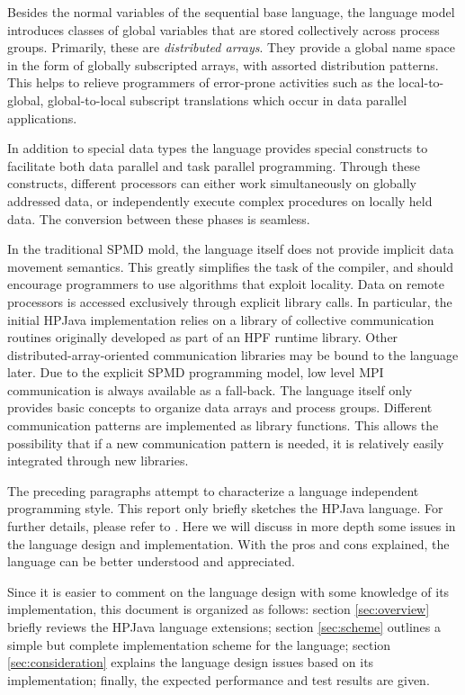 Besides the normal variables of the sequential base language, the
language model introduces classes of global variables that are stored
collectively across process groups.  Primarily, these are {\em
distributed arrays}.  They provide a global name space in the form of
globally subscripted arrays, with assorted distribution patterns.  This
helps to relieve programmers of error-prone activities such as the
local-to-global, global-to-local subscript translations which occur in
data parallel applications.

In addition to special data types the language provides special
constructs to facilitate both data parallel and task parallel
programming.  Through these constructs, different processors can either
work simultaneously on globally addressed data, or independently execute
complex procedures on locally held data.  The conversion between these
phases is seamless.

In the traditional SPMD mold, the language itself does not provide
implicit data movement semantics.  This greatly simplifies the task of
the compiler, and should encourage programmers to use algorithms that
exploit locality.  Data on remote processors is accessed exclusively
through explicit library calls.  In particular, the initial HPJava
implementation relies on a library of collective communication
routines originally developed as part of an HPF runtime library.
Other distributed-array-oriented communication libraries may be
bound to the language later.  Due to the explicit SPMD programming
model, low level MPI communication is always available as a fall-back.
The language itself only provides basic concepts to organize data
arrays and process groups.  Different communication patterns are
implemented as library functions.  This allows the possibility that if
a new communication pattern is needed, it is relatively easily
integrated through new libraries.

The preceding paragraphs attempt to characterize a language independent
programming style.  This report only briefly sketches the HPJava
language.  For further details, please refer to \cite{JavaAd, High_Level_SPMD}.
Here we will discuss in more depth some issues in the language design
and implementation.  With the pros and cons explained, the language can
be better understood and appreciated.

Since it is easier to comment on the language design with some
knowledge of its implementation, this document is organized as follows:
section \ref{sec:overview} briefly reviews the HPJava language extensions;
section \ref{sec:scheme} outlines a simple but complete implementation
scheme for the language; section \ref{sec:consideration} explains the
language design issues based on its implementation; finally, the
expected performance and test results are given.

